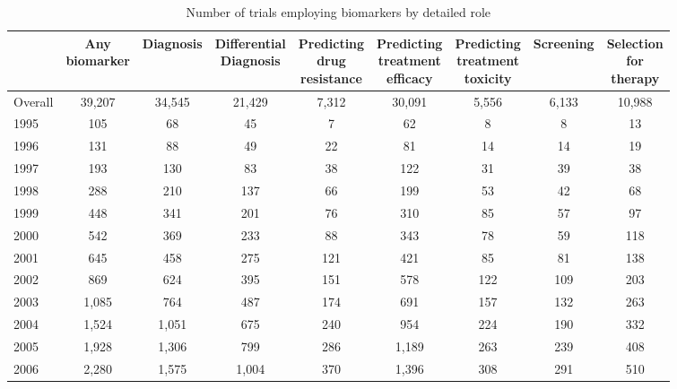 \begin{table}[htbp]\centering
\caption{Number of trials employing biomarkers by detailed role}
\begin{tabular}{l*{8}{c}}
\hline\hline
          &\shortstack{Any\\biomarker}&Diagnosis&\shortstack{Differential\\Diagnosis}&\shortstack{Predicting\\drug\\resistance}&\shortstack{Predicting\\treatment\\efficacy}&\shortstack{Predicting\\treatment\\toxicity}&Screening&\shortstack{Selection\\for\\therapy}\\
\hline
Overall   &   39,207&   34,545&   21,429&    7,312&   30,091&    5,556&    6,133&   10,988\\
1995      &      105&       68&       45&        7&       62&        8&        8&       13\\
1996      &      131&       88&       49&       22&       81&       14&       14&       19\\
1997      &      193&      130&       83&       38&      122&       31&       39&       38\\
1998      &      288&      210&      137&       66&      199&       53&       42&       68\\
1999      &      448&      341&      201&       76&      310&       85&       57&       97\\
2000      &      542&      369&      233&       88&      343&       78&       59&      118\\
2001      &      645&      458&      275&      121&      421&       85&       81&      138\\
2002      &      869&      624&      395&      151&      578&      122&      109&      203\\
2003      &    1,085&      764&      487&      174&      691&      157&      132&      263\\
2004      &    1,524&    1,051&      675&      240&      954&      224&      190&      332\\
2005      &    1,928&    1,306&      799&      286&    1,189&      263&      239&      408\\
2006      &    2,280&    1,575&    1,004&      370&    1,396&      308&      291&      510\\

\end{tabular}
\end{table}
